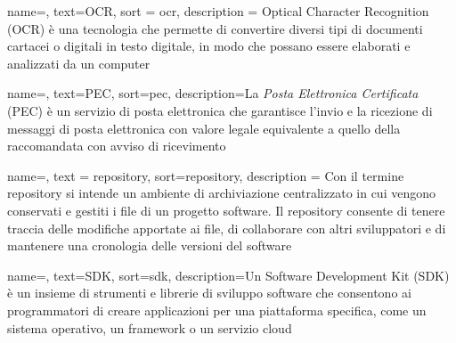 

 {
    name=,
    text=OCR,
    sort = ocr,
    description = {Optical Character Recognition (OCR) è
    una tecnologia che permette di convertire diversi tipi di documenti cartacei o digitali in testo digitale, in modo che possano essere elaborati e analizzati da un computer}
}

 {
    name=,
    text=PEC,
    sort=pec,
    description={La \emph{Posta Elettronica Certificata} (PEC) è un servizio di posta elettronica che garantisce l'invio e la ricezione di messaggi di posta elettronica con valore legale equivalente a quello della raccomandata con avviso di ricevimento}
}

 {
    name=,
    text = repository,
    sort=repository,
    description = {Con il termine repository si intende un ambiente di archiviazione centralizzato in cui vengono conservati e gestiti i file di un progetto software. Il repository consente di tenere traccia delle modifiche apportate ai file, di collaborare con altri sviluppatori e di mantenere una cronologia delle versioni del software
    }
}


 {
    name=,
    text=SDK,
    sort=sdk,
    description={Un Software Development Kit (SDK) è un insieme di strumenti e librerie di sviluppo software che consentono ai programmatori di creare applicazioni per una piattaforma specifica, come un sistema operativo, un framework o un servizio cloud}
}

